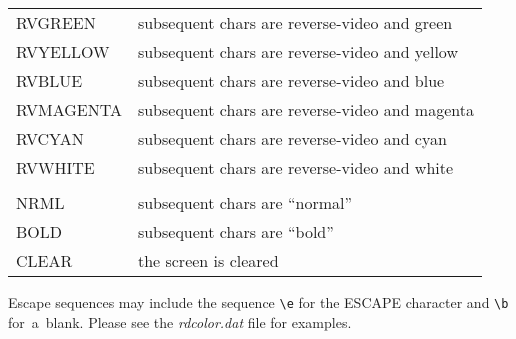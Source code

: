 \documentclass[12pt]{article}
\begin{document}
\begin{table}[thb]
\begin{center}
\begin{tabular}{||l|l||}
  {\small RVGREEN}   & subsequent chars are reverse-video and green   \\
  {\small RVYELLOW}  & subsequent chars are reverse-video and yellow  \\
  {\small RVBLUE}    & subsequent chars are reverse-video and blue    \\
  {\small RVMAGENTA} & subsequent chars are reverse-video and magenta \\
  {\small RVCYAN}    & subsequent chars are reverse-video and cyan    \\
  {\small RVWHITE}   & subsequent chars are reverse-video and white   \\
                     &                                                \\
  {\small NRML}      & subsequent chars are ``normal''                \\
  {\small BOLD}      & subsequent chars are ``bold''                  \\
  {\small CLEAR}     & the screen is cleared                          \\
  \hline\hline
  \end{tabular}
  \end{center}
\end{table}

Escape sequences may include the sequence \verb`\e` for the {\small ESCAPE}
character and \verb`\b` for~a~blank.  Please see the {\em rdcolor.dat} file
for examples.
\end{document}
